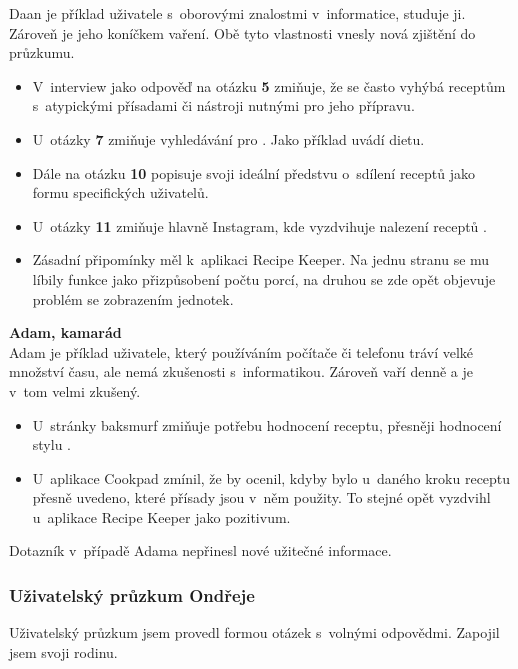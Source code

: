 \documentclass[a4paper, 11pt]{article}
\newcommand{\sss}[1]{\subsubsection{#1}} %
\begin{document}
    Daan je příklad uživatele s~oborovými znalostmi v~informatice, studuje ji. Zároveň je
    jeho koníčkem vaření. Obě tyto vlastnosti vnesly nová zjištění do průzkumu.

    \begin{itemize}
        \item V~interview jako odpověď na otázku \textbf{5} zmiňuje, že se často vyhýbá receptům s~atypickými
        přísadami či nástroji nutnými pro jeho přípravu.
        \item U~otázky \textbf{7} zmiňuje vyhledávání pro . Jako příklad uvádí
        dietu.
        \item Dále na otázku \textbf{10} popisuje svoji ideální předstvu o~sdílení
        receptů jako formu  specifických uživatelů.
        \item U~otázky \textbf{11} zmiňuje hlavně Instagram, kde vyzdvihuje nalezení receptů .
        \item Zásadní připomínky měl k~aplikaci Recipe Keeper. Na jednu stranu se mu líbily funkce jako
        přizpůsobení počtu porcí, na druhou se zde opět objevuje problém se zobrazením jednotek.
    \end{itemize}

    \noindent\textbf{Adam, kamarád} \\[-1em]

    Adam je příklad uživatele, který používáním počítače či telefonu tráví velké množství času,
    ale nemá zkušenosti s~informatikou. Zároveň vaří denně a je v~tom velmi zkušený.

    \begin{itemize}
        \item U~stránky baksmurf zmiňuje potřebu hodnocení receptu, přesněji hodnocení
        stylu .
        \item U~aplikace Cookpad zmínil, že by ocenil, kdyby bylo u~daného kroku receptu přesně
        uvedeno, které přísady jsou v~něm použity. To stejné opět vyzdvihl u~aplikace Recipe Keeper
        jako pozitivum.
    \end{itemize}

    Dotazník v~případě Adama nepřinesl nové užitečné informace.

    \sss{Uživatelský průzkum Ondřeje}

	Uživatelský průzkum jsem provedl formou otázek s~volnými odpovědmi.
	Zapojil jsem svoji rodinu. \\
\end{document}
